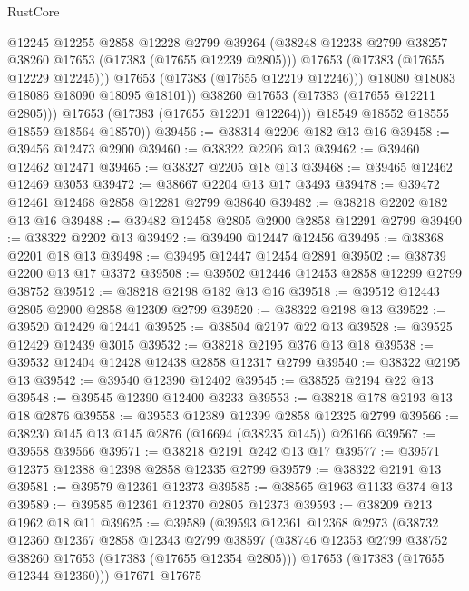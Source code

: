 \begin{lexlean}{RustCore}
\begin{coremodule}
                    @12245
                    @12255
                    @2858
                    @12228
                    @2799
                    @39264
                    (@38248 @12238 @2799 @38257 @38260 @17653 (@17383 (@17655 @12239 @2805)))
                    @17653
                    (@17383 (@17655 @12229 @12245)))
                  @17653
                  (@17383 (@17655 @12219 @12246)))
                @18080
                @18083
                @18086
                @18090
                @18095
                @18101))
            @38260
            @17653
            (@17383 (@17655 @12211 @2805)))
          @17653
          (@17383 (@17655 @12201 @12264)))
        @18549
        @18552
        @18555
        @18559
        @18564
        @18570))
@39456 := @38314 @2206 @182 @13 @16
@39458 := @39456 @12473 @2900
@39460 := @38322 @2206 @13
@39462 := @39460 @12462 @12471
@39465 := @38327 @2205 @18 @13
@39468 := @39465 @12462 @12469 @3053
@39472 := @38667 @2204 @13 @17 @3493
@39478 := @39472 @12461 @12468 @2858 @12281 @2799 @38640
@39482 := @38218 @2202 @182 @13 @16
@39488 := @39482 @12458 @2805 @2900 @2858 @12291 @2799
@39490 := @38322 @2202 @13
@39492 := @39490 @12447 @12456
@39495 := @38368 @2201 @18 @13
@39498 := @39495 @12447 @12454 @2891
@39502 := @38739 @2200 @13 @17 @3372
@39508 := @39502 @12446 @12453 @2858 @12299 @2799 @38752
@39512 := @38218 @2198 @182 @13 @16
@39518 := @39512 @12443 @2805 @2900 @2858 @12309 @2799
@39520 := @38322 @2198 @13
@39522 := @39520 @12429 @12441
@39525 := @38504 @2197 @22 @13
@39528 := @39525 @12429 @12439 @3015
@39532 := @38218 @2195 @376 @13 @18
@39538 := @39532 @12404 @12428 @12438 @2858 @12317 @2799
@39540 := @38322 @2195 @13
@39542 := @39540 @12390 @12402
@39545 := @38525 @2194 @22 @13
@39548 := @39545 @12390 @12400 @3233
@39553 := @38218 @178 @2193 @13 @18 @2876
@39558 := @39553 @12389 @12399 @2858 @12325 @2799
@39566 := @38230 @145 @13 @145 @2876 (@16694 (@38235 @145)) @26166
@39567 := @39558 @39566
@39571 := @38218 @2191 @242 @13 @17
@39577 := @39571 @12375 @12388 @12398 @2858 @12335 @2799
@39579 := @38322 @2191 @13
@39581 := @39579 @12361 @12373
@39585 := @38565 @1963 @1133 @374 @13
@39589 := @39585 @12361 @12370 @2805 @12373
@39593 := @38209 @213 @1962 @18 @11
@39625 := @39589
    (@39593
      @12361
      @12368
      @2973
      (@38732
        @12360
        @12367
        @2858
        @12343
        @2799
        @38597
        (@38746 @12353 @2799 @38752 @38260 @17653 (@17383 (@17655 @12354 @2805)))
        @17653
        (@17383 (@17655 @12344 @12360)))
      @17671
      @17675

\end{coremodule}
\end{lexlean}
